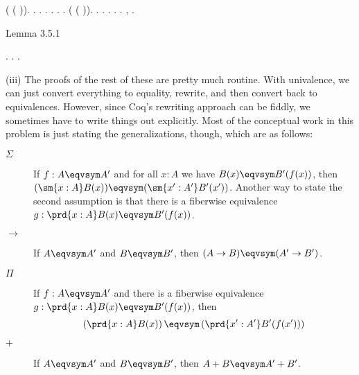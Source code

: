\begin{coqdoccode}
\coqdocindent{2.00em}
 (\coqdocnotation{(} \coqdocnotation{)} \coqdocnotation{=} \coqdocnotation{(} ( )\coqdocnotation{)}).\coqdoceol
\coqdocindent{2.00em}
 .  . .\coqdoceol
\coqdocindent{2.00em}
 .  .\coqdoceol
\coqdocindent{2.00em}
 .\coqdoceol
\coqdocindent{2.00em}
 (\coqdocnotation{(} \coqdocnotation{)} \coqdocnotation{=} \coqdocnotation{(} ( )\coqdocnotation{)}).\coqdoceol
\coqdocindent{2.00em}
 .  . .\coqdoceol
\coqdocindent{2.00em}
 .  .\coqdoceol
\coqdocemptyline
\coqdocindent{0.50em}
 , .\coqdoceol
\coqdocemptyline
\coqdocindent{0.50em}
\begin{coqdoccomment}
\coqdocindent{0.50em}
Lemma\coqdocindent{0.50em}
3.5.1\coqdocindent{0.50em}
\end{coqdoccomment}
\coqdoceol
\coqdocindent{0.50em}
 .  .\coqdoceol
\coqdocnoindent
{}.\coqdoceol
\coqdocemptyline
\coqdocemptyline
\end{coqdoccode}
\noindent
(iii)  The proofs of the rest of these are pretty much routine.  With
univalence, we can just convert everything to equality, rewrite, and then
convert back to equivalences.  However, since Coq's rewriting approach can be
fiddly, we sometimes have to write things out explicitly.  Most of the
conceptual work in this problem is just stating the generalizations, though,
which are as follows:
\begin{description}
\item[$\Sigma$]  If $f : A \eqvsym A'$ and for all $x:A$ we have $B(x) \eqvsym
B'(f(x))$, then $(\sm{x:A}B(x)) \eqvsym (\sm{x':A'} B'(x'))$.  Another way to
state the second assumption is that there is a fiberwise equivalence $g:
\prd{x:A} B(x) \eqvsym B'(f(x))$.

\item[$\to$] If $A \eqvsym A'$ and $B \eqvsym B'$, then $(A \to B) \eqvsym (A'
\to B')$.

\item[$\Pi$] If $f : A \eqvsym A'$ and there is a fiberwise equivalence $g :
\prd{x:A}B(x) \eqvsym B'(f(x))$, then 
\[
  \left(\prd{x:A} B(x)\right) \eqvsym \left(\prd{x':A'} B'(f(x'))\right)
\]

\item[$+$] If $A \eqvsym A'$ and $B \eqvsym B'$, then $A + B \eqvsym A' + B'$.
\end{description}
